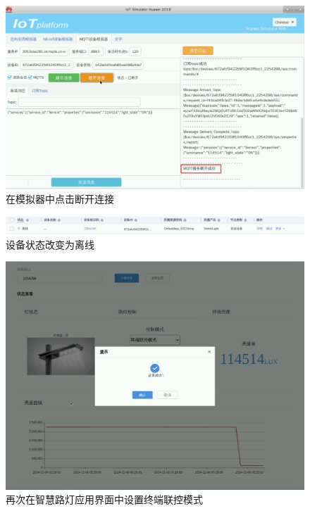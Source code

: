 \begin{figure}[!htbp]
\centering
\includegraphics[width=\textwidth]{figures/序列 01.00_23_56_44.Still020.png}
\caption{在模拟器中点击断开连接}\label{在模拟器中点击断开连接}
\end{figure}

\begin{figure}[!htbp]
\centering
\includegraphics[width=\textwidth]{figures/序列 01.00_24_23_14.Still022.png}
\caption{设备状态改变为离线}\label{设备状态改变为离线}
\end{figure}


\begin{figure}[!htbp]
\centering
\includegraphics[width=\textwidth]{figures/序列 01.00_24_06_03.Still021.png}
\caption{再次在智慧路灯应用界面中设置终端联控模式}\label{再次在智慧路灯应用界面中设置终端联控模式}
\end{figure}


